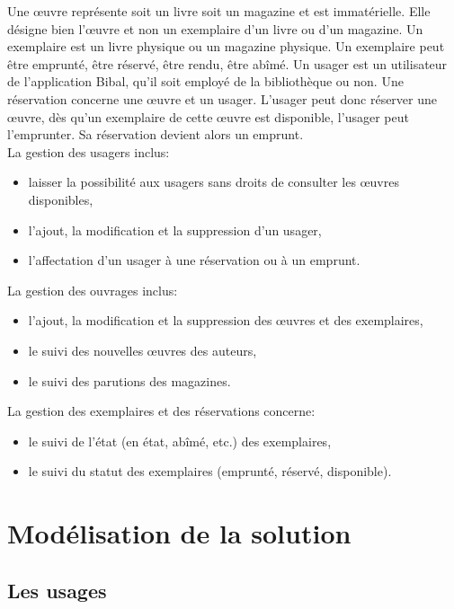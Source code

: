 \documentclass[a4paper,12pt]{article}
\begin{document}
Une œuvre représente soit un livre soit un magazine et est immatérielle. Elle
désigne bien l’œuvre et non un exemplaire d’un livre ou d’un magazine. Un
exemplaire est un livre physique ou un magazine physique. Un exemplaire peut
être emprunté, être réservé, être rendu, être abîmé. Un usager est un
utilisateur de l’application Bibal, qu’il soit employé de la bibliothèque ou
non. Une réservation concerne une œuvre et un usager. L’usager peut donc
réserver une œuvre, dès qu’un exemplaire de cette œuvre est disponible,
l’usager peut l’emprunter. Sa réservation devient alors un emprunt.\\



La gestion des usagers inclus:
\begin{itemize}
\item laisser la possibilité aux usagers sans droits de consulter les œuvres disponibles,
\item l’ajout, la modification et la suppression d’un usager,
\item l’affectation d’un usager à une réservation ou à un emprunt.
\end{itemize}

La gestion des ouvrages inclus:
\begin{itemize}
\item l’ajout, la modification et la suppression des œuvres et des exemplaires,
\item le suivi des nouvelles œuvres des auteurs,
\item le suivi des parutions des magazines.
\end{itemize}

La gestion des exemplaires et des réservations concerne:
\begin{itemize}
\item le suivi de l’état (en état, abîmé, etc.) des exemplaires,
\item le suivi du statut des exemplaires (emprunté, réservé, disponible).
\end{itemize}

\clearpage

\section{Modélisation de la solution}
\label{sec:orgheadline16}
\subsection{Les usages}
\label{sec:orgheadline6}
\end{document}
